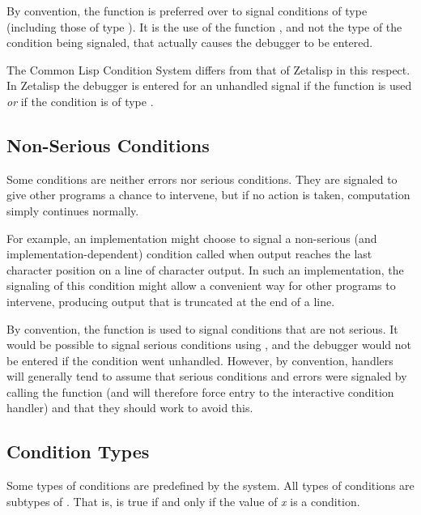 By convention, the function  is preferred over  to signal conditions
of type  (including those of type ). It is the use of
the function , and not the type of the condition being signaled, that
actually causes the debugger to be entered.

\beforenoterule
\begin{incompatibility}
The Common Lisp Condition System differs from that of Zeta{}lisp in this respect.
In Zetalisp the debugger is entered for an unhandled signal if the 
function is used {\it or} if the condition is of type .
\end{incompatibility}
\afternoterule

\subsection{Non-Serious Conditions}

Some conditions are neither errors nor serious conditions. They are signaled
to give other programs a chance to intervene, but if no action is taken,
computation simply continues normally.

For example, an implementation might choose to signal a non-serious (and
implementation-dependent) condition
called  when output reaches the last character position on a line
of character output. In such an implementation, the signaling of this
condition might allow a convenient way for other programs to intervene,
producing output that is truncated at the end of a line.

By convention, the function  is used to signal conditions that are not
serious. It would be possible to signal serious conditions using , and
the debugger would not be entered if the condition went unhandled.  However,
by convention,
handlers will generally tend to assume that serious conditions and errors
were signaled by calling the  function (and will therefore
force entry to the interactive condition handler) and that they should
work to avoid this.


\subsection{Condition Types}

Some types of conditions are predefined by the system. All types of conditions
are subtypes of . That is,  is true if
and only if the value of {\it x} is a condition. 

